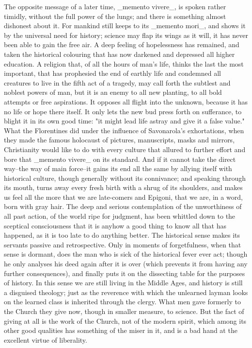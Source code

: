 The opposite message of a later time, _memento vivere_, is spoken
rather timidly, without the full power of the lungs; and there is
something almost dishonest about it. For mankind still keeps to its
_memento mori_, and shows it by the universal need for history;
science may flap its wings as it will, it has never been able to gain
the free air. A deep feeling of hopelessness has remained, and taken
the historical colouring that has now darkened and depressed all
higher education. A religion that, of all the hours of man's life,
thinks the last the most important, that has prophesied the end of
earthly life and condemned all creatures to live in the fifth act of
a tragedy, may call forth the subtlest and noblest powers of man, but
it is an enemy to all new planting, to all bold attempts or free
aspirations. It opposes all flight into the unknown, because it has
no life or hope there itself. It only lets the new bud press forth on
sufferance, to blight it in its own good time: "it might lead life
astray and give it a false value." What the Florentines did under the
influence of Savonarola's exhortations, when they made the famous
holocaust of pictures, manuscripts, masks and mirrors, Christianity
would like to do with every culture that allured to further effort
and bore that _memento vivere_ on its standard. And if it cannot take
the direct way--the way of main force--it gains its end all the same
by allying itself with historical culture, though generally without
its connivance; and speaking through its mouth, turns away every
fresh birth with a shrug of its shoulders, and makes us feel all the
more that we are late-comers and Epigoni, that we are, in a word,
born with gray hair. The deep and serious contemplation of the
unworthiness of all past action, of the world ripe for judgment, has
been whittled down to the sceptical consciousness that it is anyhow a
good thing to know all that has happened, as it is too late to do
anything better. The historical sense makes its servants passive and
retrospective. Only in moments of forgetfulness, when that sense is
dormant, does the man who is sick of the historical fever ever act;
though he only analyses his deed again after it is over (which
prevents it from having any further consequences), and finally puts
it on the dissecting table for the purposes of history. In this sense
we are still living in the Middle Ages, and history is still a
disguised theology; just as the reverence with which the unlearned
layman looks on the learned class is inherited through the clergy.
What men gave formerly to the Church they give now, though in smaller
measure, to science. But the fact of giving at all is the work of the
Church, not of the modern spirit, which among its other good
qualities has something of the miser in it, and is a bad hand at the
excellent virtue of liberality.

